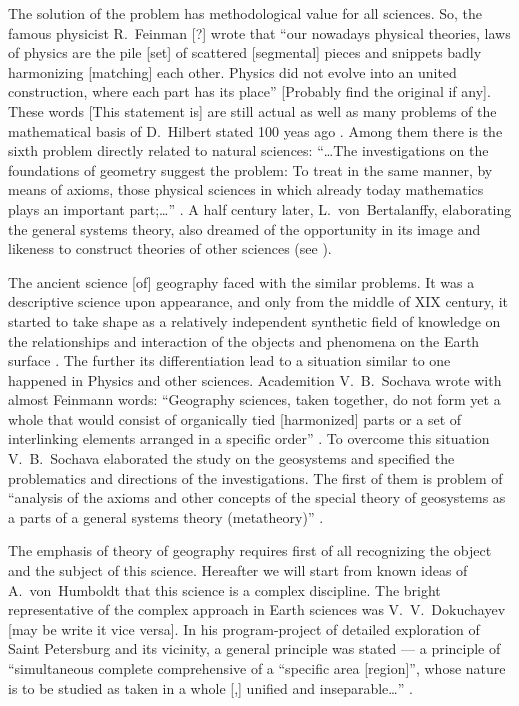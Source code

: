 \documentclass[12pt,leqno]{book}
\numberwithin{equation}{chapter}
\begin{document}
The solution of the problem has methodological value for all sciences. So, the famous physicist R.~Feinman [?] \cite{b437} wrote that ``our nowadays physical theories, laws of physics are the pile [set] of scattered [segmental] pieces and snippets badly harmonizing [matching] each other. Physics did not evolve into an united construction, where each part has its place'' [Probably find the original if any]. These words [This statement is] are still actual as well as many problems of the mathematical basis of D.~Hilbert stated 100 yeas ago \cite{b347}. Among them there is the sixth problem directly related to natural sciences: ``\ldots The investigations on the foundations of geometry suggest the problem: To treat in the same manner, by means of axioms, those physical sciences in which already today mathematics plays an important part;\ldots{}'' \cite[p.~34]{b347}. A half century later, L.~von~Bertalanffy, elaborating the general systems theory, also dreamed of the opportunity in its image and likeness to construct theories of other sciences (see \cite{b367}).

The ancient science [of] geography faced with the similar problems. It was a descriptive science upon appearance, and only from the middle of XIX century, it started to take shape as a relatively independent synthetic field of knowledge on the relationships and interaction of the objects and phenomena on the Earth surface \cite{b118,b176}. The further its differentiation lead to a situation similar to one happened in Physics and other sciences. Academition V.~B.~Sochava wrote with almost Feinmann words: ``Geography sciences, taken together, do not form yet a whole that would consist of organically tied [harmonized] parts or a set of interlinking elements arranged in a specific order'' \cite[p.~480]{b397}. To overcome this situation V.~B.~Sochava elaborated the study on the geosystems and specified the problematics and directions of the investigations. The first of them is problem of ``analysis of the axioms and other concepts of the special theory of geosystems as a parts of a general systems theory (metatheory)'' \cite[p.~15]{p397}.

The emphasis of theory of geography requires first of all recognizing the object and the subject of this science. Hereafter we will start from known ideas of A.~von~Humboldt that this science is a complex discipline. The bright representative of the complex approach in Earth sciences was V.~V.~Dokuchayev [may be write it vice versa]. In his program-project of detailed exploration of Saint Petersburg and its vicinity, a general principle was stated --- a principle of ``simultaneous complete comprehensive of a ``specific area [region]'', whose nature is to be studied as taken in a whole [,] unified and inseparable\ldots{}'' \cite[p.~461]{p152}.
\end{document}
